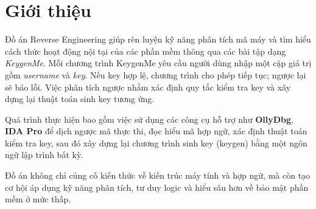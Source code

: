\section{Giới thiệu}

Đồ án Reverse Engineering giúp rèn luyện kỹ năng phân tích mã máy và tìm hiểu cách thức hoạt động nội tại của các phần mềm thông qua các bài tập dạng \textit{KeygenMe}. Mỗi chương trình KeygenMe yêu cầu người dùng nhập một cặp giá trị gồm \textit{username} và \textit{key}. Nếu key hợp lệ, chương trình cho phép tiếp tục; ngược lại sẽ báo lỗi. Việc phân tích ngược nhằm xác định quy tắc kiểm tra key và xây dựng lại thuật toán sinh key tương ứng.

Quá trình thực hiện bao gồm việc sử dụng các công cụ hỗ trợ như \textbf{OllyDbg}, \textbf{IDA Pro} để dịch ngược mã thực thi, đọc hiểu mã hợp ngữ, xác định thuật toán kiểm tra key, sau đó xây dựng lại chương trình sinh key (keygen) bằng một ngôn ngữ lập trình bất kỳ.

Đồ án không chỉ củng cố kiến thức về kiến trúc máy tính và hợp ngữ, mà còn tạo cơ hội áp dụng kỹ năng phân tích, tư duy logic và hiểu sâu hơn về bảo mật phần mềm ở mức thấp.